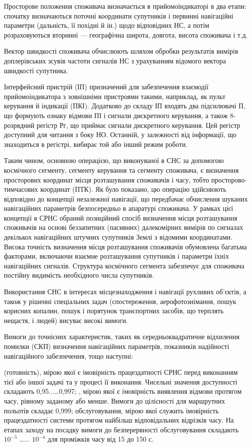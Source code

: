 Просторове положення споживача визначається в прийомоіндикаторі в два етапи: спочатку визначаються 
поточні координати супутників і первинні навігаційні параметри (дальність, її похідні й ін.) щодо 
відповідних НС, а потім розраховуються вторинні --- географічна широта, довгота, висота споживача і т.д.

Вектор швидкості споживача обчислюють шляхом обробки результатів вимірів доплерівських зсувів 
частоти сигналів НС з урахуванням відомого вектора швидкості супутника. 

Інтерфейсний пристрій (ІП) призначений для забезпечення взаємодії прийомоіндикатора з зовнішніми 
пристроями такими, наприклад, як пульт керування й індикації (ПКІ). Додатково до складу ІП входять 
два підсилювачі П, що формують ознаку відмови ПІ і сигнали дискретного керування, а також 8-розрядний 
регістр Рг, що приймає сигнали дискретного керування. Цей регістр доступний для читання з боку НО. 
Останній, у залежності від інформації, що знаходиться в регістрі, вибирає той або інший режим роботи.

Таким чином, основною операцією, що виконуваної в СНС за допомогою космічного сегменту, сегменту 
керування та сегменту споживача, є визначення просторових координат місця розташування споживачів і 
часу, тобто просторово-тимчасових координат (ПТК). Як було показано, цю операцію здійснюють відповідно 
до концепції незалежної навігації, що передбачає обчислення шуканих навігаційних параметрів 
безпосередньо в апаратурі споживача. У рамках цієї концепції в СРНС обраний позиційний спосіб 
визначення місця розташування споживачів на основі беззапитних (пасивних) далекомірних вимірів по 
сигналах декількох навігаційних штучних супутників Землі з відомими координатами. Висока точність 
визначення місця розташування споживачів обумовлена багатьма факторами, включаючи взаємне розташування 
супутників і параметри їхніх навігаційних сигналів. Структура космічного сегмента забезпечує для 
споживача постійну видимість необхідного числа супутників.

Використання СНС в інтересах місцезнаходження і навігації рухливих об'єктів, а також у рішенні 
спеціальних задач (спостереження, аерофотознімання, пошук корисних копалин, пошук і порятунок 
транспортних засобів, що терплять нещастя, і людей) висуває високі вимоги.

Вимоги до точнісних характеристик, таких як середньоквадратичне відхилення помилки (СКП) визначення 
навігаційних параметрів, показників надійності навігаційного забезпечення, тощо наступні:
\begin{itemize}
   (готовність),  мірою якої є імовірність працездатності СРНС перед виконанням 
тієї або іншої задачі та у процесі її виконання. Чисельні значення доступності складають 0,95...\dots 0,997;
 , мірою якої є імовірність виявлення відмови протягом часу, рівному заданому 
або менше. Вимоги до цілісності для маршрутних польотів складає 0,999;
  обслуговування, мірою якої служить імовірність працездатності системи 
протягом найбільш відповідальних відрізків часу. На етапах заходу на посадку вимоги до безперервності 
обслуговування складають $10^{-5}$ \dots ... $10^{-4}$ для проміжків часу від 15 до 150 с.
\end{itemize}

